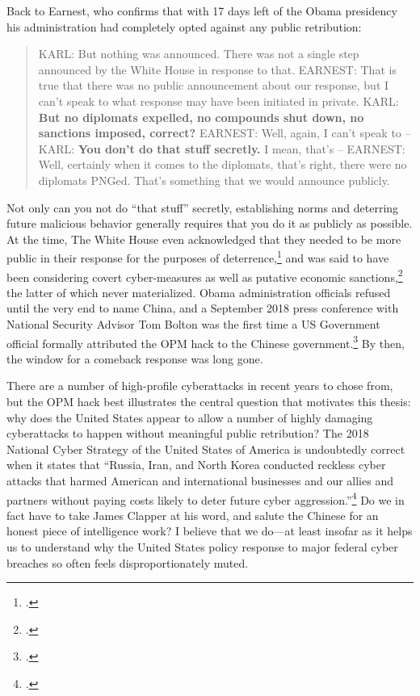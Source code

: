 \documentclass{report}
\begin{document}
\begin{refsegment}
Back to Earnest, who confirms that with 17 days left of the Obama presidency his administration had completely opted against any public retribution:

\begin{quote}
KARL: But nothing was announced. There was not a single step announced by the White House in response to that.
\newline \newline
EARNEST: That is true that there was no public announcement about our response, but I can't speak to what response may have been initiated in private.
\newline \newline
KARL: \textbf{But no diplomats expelled, no compounds shut down, no sanctions imposed, correct?}
\newline \newline
EARNEST: Well, again, I can't speak to --
\newline \newline
KARL: \textbf{You don't do that stuff secretly.}  I mean, that's --
\newline \newline
EARNEST: Well, certainly when it comes to the diplomats, that's right, there were no diplomats PNGed. That's something that we would announce publicly.
\end{quote}

Not only can you not do ``that stuff'' secretly, establishing norms and deterring future malicious behavior generally requires that you do it as publicly as possible. At the time, The White House even acknowledged that they needed to be more public in their response for the purposes of deterrence,\footcite{sanger_u.s._2017} and was said to have been considering covert cyber-measures as well as putative economic sanctions,\footcite{nakashima_hacks_2015} the latter of which never materialized. Obama administration officials refused until the very end to name China, and a September 2018 press conference with National Security Advisor Tom Bolton was the first time a US Government official formally attributed the OPM hack to the Chinese government.\footcite{sanger_trump_2018} By then, the window for a comeback response was long gone.

There are a number of high-profile cyberattacks in recent years to chose from, but the OPM hack best illustrates the central question that motivates this thesis: why does the United States appear to allow a number of highly damaging cyberattacks to happen without meaningful public retribution? The 2018 National Cyber Strategy of the United States of America is undoubtedly correct when it states that ``Russia, Iran, and North Korea conducted reckless cyber attacks that harmed American and international businesses and our allies and partners without paying costs likely to deter future cyber aggression.''\footcite{trump_national_2018} Do we in fact have to take James Clapper at his word, and salute the Chinese for an honest piece of intelligence work? I believe that we do---at least insofar as it helps us to understand why the United States policy response to major federal cyber breaches so often feels disproportionately muted.


\end{refsegment}
\end{document}
